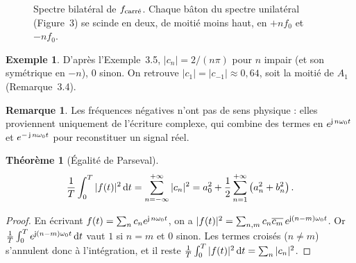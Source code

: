 \documentclass[a4paper,11pt]{article}
\theoremstyle{definition}
\newtheorem{theorem}{Théorème}[section]
\newtheorem{exemple}{Exemple}[section]
\newtheorem{remark}{Remarque}[section]
\begin{document}
\begin{figure}[h]
    \centering
    \caption{Spectre bilatéral de $f_{\rm carr\acute{e}}$. Chaque bâton du spectre unilatéral (Figure~3) se scinde en deux, de moitié moins haut, en $+nf_0$ et $-nf_0$.}
\end{figure}

\begin{exemple}
    D'après l'Exemple~3.5, $|c_n|=2/(n\pi)$ pour $n$ impair (et son symétrique en $-n$), $0$ sinon. On retrouve $|c_1|=|c_{-1}|\approx0{,}64$, soit la moitié de $A_1$ (Remarque~3.4).
\end{exemple}

\begin{remark}
    Les fréquences négatives n'ont pas de sens physique : elles proviennent uniquement de l'écriture complexe, qui combine des termes en $e^{\operatorname{\mathsf{j}} n\omega_0 t}$ et $e^{-\operatorname{\mathsf{j}} n\omega_0 t}$ pour reconstituer un signal réel.
\end{remark}

\begin{theorem}[Égalité de Parseval]
    $$
        \frac1T\int_0^T |f(t)|^2\,{\rm d} t = \sum_{n=-\infty}^{+\infty} |c_n|^2 = a_0^2 + \frac12\sum_{n=1}^{+\infty}\left(a_n^2+b_n^2\right).
    $$
\end{theorem}

\begin{proof}
    En écrivant $f(t) = \sum_n c_n e^{\operatorname{\mathsf{j}} n\omega_0 t}$, on a $|f(t)|^2 = \sum_{n,m} c_n\overline{c_m}\,e^{\operatorname{\mathsf{j}}(n-m)\omega_0 t}$. Or $\frac1T\int_0^T e^{\operatorname{\mathsf{j}}(n-m)\omega_0 t}\,{\rm d} t$ vaut $1$ si $n=m$ et $0$ sinon. Les termes croisés ($n\neq m$) s'annulent donc à l'intégration, et il reste $\frac1T\int_0^T |f(t)|^2\,{\rm d} t = \sum_n |c_n|^2$.
\end{proof}
\end{document}
